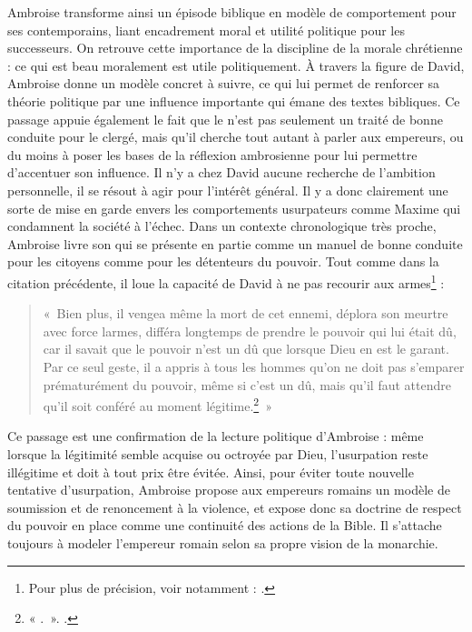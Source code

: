 Ambroise transforme ainsi un épisode biblique en modèle de comportement pour ses contemporains, liant encadrement moral et utilité politique pour les successeurs. On retrouve cette importance de la discipline de la morale chrétienne : ce qui est beau moralement est utile politiquement. À travers la figure de David, Ambroise donne un modèle concret à suivre, ce qui lui permet de renforcer sa théorie politique par une influence importante qui émane des textes bibliques. Ce passage appuie également le fait que le  n'est pas seulement un traité de bonne conduite pour le clergé, mais qu'il cherche tout autant à parler aux empereurs, ou du moins à poser les bases de la réflexion ambrosienne pour lui permettre d'accentuer son influence. Il n'y a chez David aucune recherche de l'ambition personnelle, il se résout à agir pour l'intérêt général. Il y a donc clairement une sorte de mise en garde envers les comportements usurpateurs comme Maxime qui condamnent la société à l'échec. Dans un contexte chronologique très proche, Ambroise livre son  qui se présente en partie comme un manuel de bonne conduite pour les citoyens comme pour les détenteurs du pouvoir. Tout comme dans la citation précédente, il loue la capacité de David à ne pas recourir aux armes\footnote{Pour plus de précision, voir notamment : \cite{dulaey_david_3}.} :

\bigskip

\begin{quote}
«~Bien plus, il vengea même la mort de cet ennemi, déplora son meurtre avec force larmes, différa longtemps de prendre le pouvoir qui lui était dû, car il savait que le pouvoir n’est un dû que lorsque Dieu en est le garant. Par ce seul geste, il a appris à tous les hommes qu’on ne doit pas s’emparer prématurément du pouvoir, même si c’est un dû, mais qu’il faut attendre qu’il soit conféré au moment légitime.\footnote{« .~». \cite[]{ambroise_apologie_david}.}~»
\end{quote}

\bigskip

Ce passage est une confirmation de la lecture politique d’Ambroise : même lorsque la légitimité semble acquise ou octroyée par Dieu, l’usurpation reste illégitime et doit à tout prix être évitée. Ainsi, pour éviter toute nouvelle tentative d'usurpation, Ambroise propose aux empereurs romains un modèle de soumission et de renoncement à la violence, et expose donc sa doctrine de respect du pouvoir en place comme une continuité des actions de la Bible. Il s'attache toujours à modeler l'empereur romain selon sa propre vision de la monarchie.

